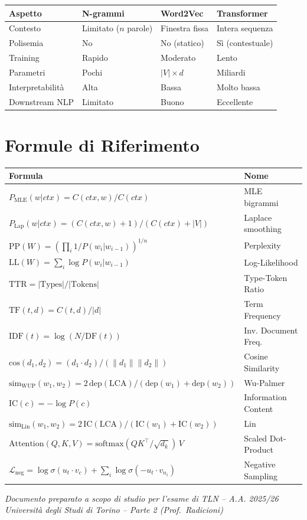 \documentclass[12pt,a4paper]{article}
\begin{document}
\begin{center}
\begin{tabular}{llll}
\toprule
\textbf{Aspetto} & \textbf{N-grammi} & \textbf{Word2Vec} & \textbf{Transformer} \\
\midrule
Contesto & Limitato ($n$ parole) & Finestra fissa & Intera sequenza \\
Polisemia & No & No (statico) & Sì (contestuale) \\
Training & Rapido & Moderato & Lento \\
Parametri & Pochi & $|V| \times d$ & Miliardi \\
Interpretabilità & Alta & Bassa & Molto bassa \\
Downstream NLP & Limitato & Buono & Eccellente \\
\bottomrule
\end{tabular}
\end{center}

\section{Formule di Riferimento}

\begin{center}
\begin{tabular}{ll}
\toprule
\textbf{Formula} & \textbf{Nome} \\
\midrule
$P_\text{MLE}(w|ctx) = C(ctx,w)/C(ctx)$ & MLE bigrammi \\
$P_\text{Lap}(w|ctx) = (C(ctx,w)+1)/(C(ctx)+|V|)$ & Laplace smoothing \\
$\text{PP}(W) = (\prod_i 1/P(w_i|w_{i-1}))^{1/n}$ & Perplexity \\
$\text{LL}(W) = \sum_i \log P(w_i|w_{i-1})$ & Log-Likelihood \\
$\text{TTR} = |\text{Types}|/|\text{Tokens}|$ & Type-Token Ratio \\
\midrule
$\text{TF}(t,d) = C(t,d)/|d|$ & Term Frequency \\
$\text{IDF}(t) = \log(N/\text{DF}(t))$ & Inv. Document Freq. \\
$\text{cos}(d_1,d_2) = (d_1 \cdot d_2)/(\|d_1\|\|d_2\|)$ & Cosine Similarity \\
\midrule
$\text{sim}_\text{WUP}(w_1,w_2) = 2\,\text{dep}(\text{LCA})/(\text{dep}(w_1)+\text{dep}(w_2))$ & Wu-Palmer \\
$\text{IC}(c) = -\log P(c)$ & Information Content \\
$\text{sim}_\text{Lin}(w_1,w_2) = 2\,\text{IC}(\text{LCA})/(\text{IC}(w_1)+\text{IC}(w_2))$ & Lin \\
\midrule
$\text{Attention}(Q,K,V) = \text{softmax}(QK^\top/\sqrt{d_k})\,V$ & Scaled Dot-Product \\
$\mathcal{L}_\text{neg} = \log\sigma(u_t\cdot v_c)+\sum_i\log\sigma(-u_t\cdot v_{n_i})$ & Negative Sampling \\
\bottomrule
\end{tabular}
\end{center}

\vfill
\begin{center}
\color{darkgray}\small\itshape
Documento preparato a scopo di studio per l'esame di TLN -- A.A. 2025/26\\
Università degli Studi di Torino -- Parte 2 (Prof.\ Radicioni)
\end{center}
\end{document}
